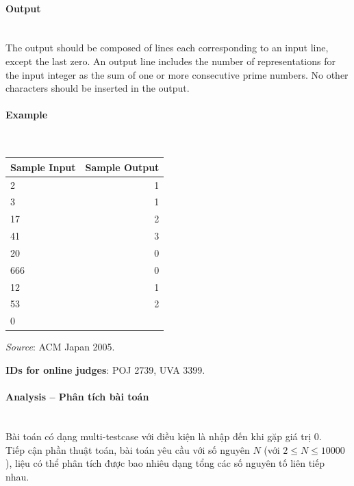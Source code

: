 \documentclass{article}
\begin{document}
\paragraph{Output}\mbox{} \\

The output should be composed of lines each corresponding to an input line, except the last zero.
An output line includes the number of representations for the input integer as the sum of one or
more consecutive prime numbers. No other characters should be inserted in the output.

\paragraph{Example}\mbox{} \\

\begin{table}[h]
    \centering
    \begin{tabular}{|l|r|}
        \hline
        \textbf{Sample Input} & \textbf{Sample Output} \\
        \hline
        2  &  1 \\ 
        3  &  1 \\ 
        17 &  2 \\ 
        41 &  3 \\
        20 & 0 \\
        666 & 0 \\
        12 & 1 \\ 
        53 & 2 \\
        0 & \\\hline
    \end{tabular}
\end{table}

\textit{Source}: ACM Japan 2005.

\textbf{IDs for online judges}: POJ 2739, UVA 3399.

\paragraph{Analysis -- Phân tích bài toán} \mbox{} \\

Bài toán có dạng multi-testcase với điều kiện là nhập đến khi gặp giá trị 0. \\

Tiếp cận phần thuật toán, bài toán yêu cầu với số nguyên $N$ (với $2 \leq N \leq 10000$), liệu có thể phân tích được bao nhiêu dạng tổng các số nguyên tố liên tiếp nhau. \\
\end{document}
